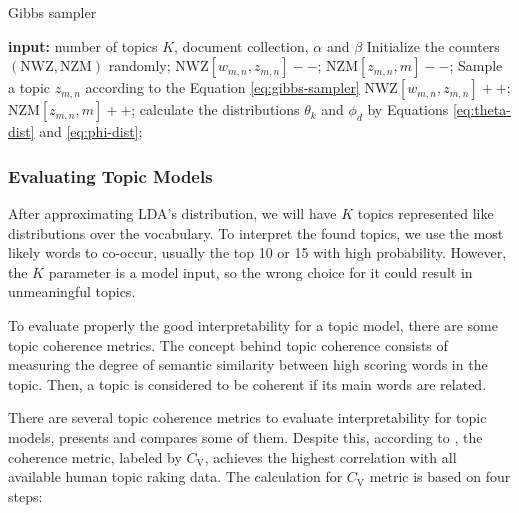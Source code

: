 	\begin{algorithm}[h!]
		\caption{Gibbs sampler}
		\label{algo:gibbs-sampling}
		\begin{algorithmic}[1]
			\State \textbf{input:} number of topics $K$, document collection, $\alpha$ and $\beta$
			\Begin
			\State Initialize the counters $(\text{NWZ}, \text{NZM})$ randomly;
			\State $\text{NWZ}[w_{m,n}, z_{m,n}]--$; $\text{NZM}[z_{m,n},m]--$;
			\State Sample a topic $z_{m,n}$ according to the Equation \ref{eq:gibbs-sampler}
			\State $\text{NWZ}[w_{m,n}, z_{m,n}]++$; $\text{NZM}[z_{m,n},m]++$;
			\EndFor
			\EndFor
			\State calculate the distributions $\theta_{k}$ and $\phi_{d}$ by Equations \ref{eq:theta-dist} and \ref{eq:phi-dist};
			\EndIf
			\EndWhile
			\End
		\end{algorithmic}
	\end{algorithm}

	\subsubsection{Evaluating Topic Models}

	After approximating LDA's distribution, we will have $K$ topics represented like distributions over the vocabulary. To interpret the found topics, we use the most likely words to co-occur, usually the top 10 or 15 with high probability. However, the $K$ parameter is a model input, so the wrong choice for it could result in unmeaningful topics.

	To evaluate properly the good interpretability for a topic model, there are some topic coherence metrics. The concept behind topic coherence consists of measuring the degree of semantic similarity between high scoring words in the topic. Then, a topic is considered to be coherent if its main words are related.

	There are several topic coherence metrics to evaluate interpretability for topic models,  presents and compares some of them.
	Despite this, according to , the coherence metric, labeled by $C_{\text{V}}$, achieves the highest correlation with all available human topic raking data. The calculation for $C_{\text{V}}$ metric is based on four steps:

